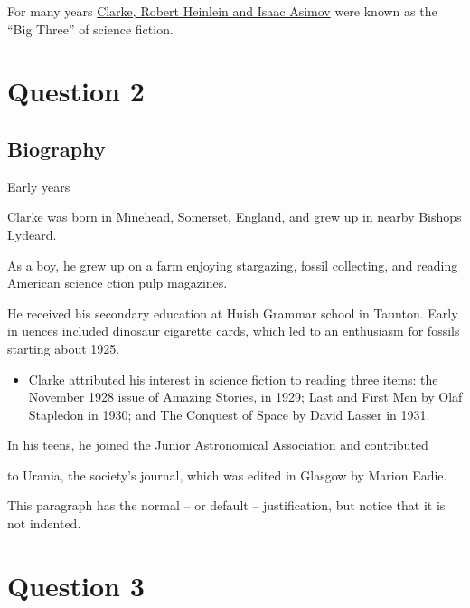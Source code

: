 \documentclass[a4paper,12pt]{article}
\begin{document}
For many years \underline{Clarke, Robert Heinlein and Isaac Asimov} were known as the ``Big Three'' of science fiction.
\pagebreak

\section{Question 2}

\subsection*{\centering Biography}
\begin{center}
Early years
\end{center}

Clarke was born in Minehead, Somerset, England, and grew up in nearby Bishops Lydeard.

\begin{flushright}
As a boy, he grew up on a farm enjoying stargazing, fossil collecting, and reading American science  ction pulp magazines.
\end{flushright}

\begin{flushleft}
He received his secondary education at Huish Grammar school in Taunton. Early in uences included dinosaur cigarette cards, which led to an enthusiasm for fossils starting about 1925.
\end{flushleft}

\begin{itemize}
\item \raggedright Clarke attributed his interest in science fiction to reading three items: the November 1928 issue of Amazing Stories, in 1929; Last and First Men by Olaf Stapledon in 1930; and The Conquest of Space by David Lasser in 1931.\par
\end{itemize}

{\raggedright In his teens, he joined the Junior Astronomical Association and contributed \par}
{\raggedleft to Urania, the society's journal, which was edited in Glasgow by Marion Eadie.\par}

\noindent This paragraph has the normal -- or default -- justification, but notice that it is not indented.
\pagebreak

\section{Question 3}
\end{document}

